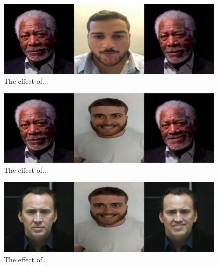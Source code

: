 \documentclass[english,12pt]{article}
\begin{document}
\begin{figure}[htb]
  \begin{centering}
      \includegraphics[scale=0.29]{images/‏‏Amit_tongue_freeman.PNG}
  \par\end{centering}
  \caption{\label{fig:Amit_tongue_freeman}The effect of...}
\end{figure}

\begin{figure}[htb]
  \begin{centering}
      \includegraphics[scale=0.29]{images/Oren_smile_freeman.PNG}
  \par\end{centering}
  \caption{\label{fig:Oren_smile_freeman}The effect of...}
\end{figure}

\begin{figure}[htb]
  \begin{centering}
      \includegraphics[scale=0.29]{images/‏‏Oren_smile_cage.PNG}
  \par\end{centering}
  \caption{\label{fig:Oren_smile_cage}The effect of...}
\end{figure}
\end{document}
